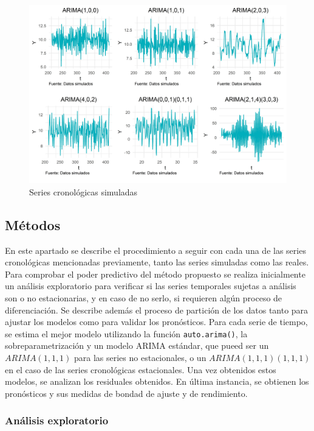 \documentclass[
]{article}
\begin{document}
\begin{figure}[H]
\includegraphics[width=1\linewidth,height=1\textheight]{Tesis_files/figure-latex/series_simuladas-1} \caption{Series cronológicas simuladas}\label{fig:series_simuladas}
\end{figure}

\subsection{Métodos}

En este apartado se describe el procedimiento a seguir con cada una de
las series cronológicas mencionadas previamente, tanto las series
simuladas como las reales. Para comprobar el poder predictivo del método
propuesto se realiza inicialmente un análisis exploratorio para
verificar si las series temporales sujetas a análisis son o no
estacionarias, y en caso de no serlo, si requieren algún proceso de
diferenciación. Se describe además el proceso de partición de los datos
tanto para ajustar los modelos como para validar los pronósticos. Para
cada serie de tiempo, se estima el mejor modelo utilizando la función
\texttt{auto.arima()}, la sobreparametrización y un modelo ARIMA
estándar, que pueed ser un \(ARIMA(1,1,1)\) para las series no
estacionales, o un \(ARIMA(1,1,1)(1,1,1)\) en el caso de las series
cronológicas estacionales. Una vez obtenidos estos modelos, se analizan
los residuales obtenidos. En última instancia, se obtienen los
pronósticos y sus medidas de bondad de ajuste y de rendimiento.

\subsubsection{Análisis exploratorio}
\end{document}
